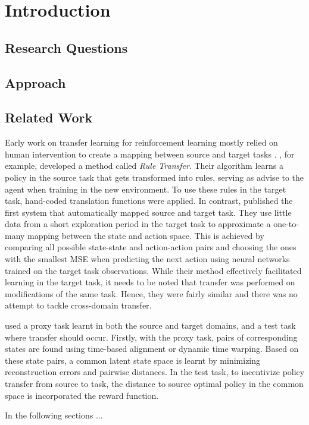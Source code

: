 \section{Introduction}
\label{sec:introduction}

\subsection{Research Questions}

\subsection{Approach}

\subsection{Related Work}
\label{sec:related-work}

Early work on transfer learning for reinforcement learning mostly relied on human intervention to create a mapping between source and target tasks \citep[e.g.][]{taylor2007cross}. \citet{taylor2007cross}, for example, developed a method called \textit{Rule Transfer}. Their algorithm learns a policy in the source task that gets transformed into rules, serving as advise to the agent when training in the new environment. To use these rules in the target task, hand-coded translation functions were applied. In contrast, \citet{taylor2008autonomous} published the first system that automatically mapped source and target task. They use little data from a short exploration period in the target task to approximate a one-to-many mapping between the state and action space. This is achieved by comparing all possible state-state and action-action pairs and choosing the ones with the smallest MSE when predicting the next action using neural networks trained on the target task observations. While their method effectively facilitated learning in the target task, it needs to be noted that transfer was performed on modifications of the same task. Hence, they were fairly similar and there was no attempt to tackle cross-domain transfer. 


\citet{gupta2017learning} used a proxy task learnt in both the source and target domains, and a test task where transfer should occur. Firstly, with the proxy task, pairs of corresponding states are found using time-based alignment or dynamic time warping. Based on these state pairs, a common latent state space is learnt by minimizing reconstruction errors and pairwise distances. In the test task, to incentivize policy transfer from source to task, the distance to source optimal policy in the common space is incorporated the reward function.



In the following sections ...

